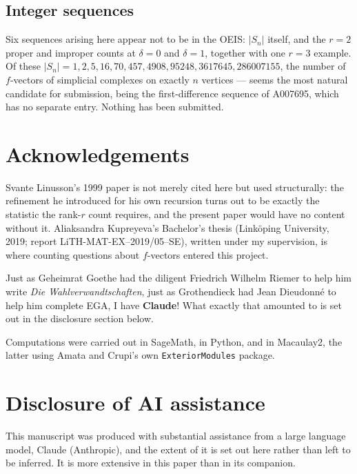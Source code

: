 \documentclass[11pt, a4paper, abstract=yes]{scrartcl}
\theoremstyle{definition}
\theoremstyle{remark}
\theoremstyle{plain}
\begin{document}
\subsection{Integer sequences}
\label{sec:org4ba6c2b}

Six sequences arising here appear not to be in the OEIS: \(|S_n|\) itself, and the \(r=2\)
proper and improper counts at \(\delta=0\) and \(\delta=1\), together with one \(r=3\) example. Of
these \(|S_n|=1,2,5,16,70,457,4908,95248,3617645,286007155\), the number of \(f\)-vectors of
simplicial complexes on exactly \(n\) vertices --- seems the most natural candidate for submission,
being the first-difference sequence of A007695, which has no separate entry. Nothing has been
submitted.
\section*{Acknowledgements}
\label{sec:org7d5e35a}
Svante Linusson's 1999 paper is not merely cited here but used structurally: the refinement he
introduced for his own recursion turns out to be exactly the statistic the rank-\(r\) count requires,
and the present paper would have no content without it. Aliaksandra Kupreyeva's Bachelor's thesis \autocite{Kupreyeva2019}
(Linköping University, 2019; report LiTH-MAT-EX--2019/05--SE), written under my supervision, is where
counting questions about \(f\)-vectors entered this project.

Just as Geheimrat Goethe had the diligent Friedrich Wilhelm Riemer to help him write \emph{Die
Wahlverwandtschaften}, just as Grothendieck had Jean Dieudonné to help him complete EGA, I have
\textbf{Claude}! What exactly that amounted to is set out in the disclosure section below.

Computations were carried out in SageMath, in Python, and in Macaulay2, the latter using Amata and
Crupi's own \texttt{ExteriorModules} package.
\section*{Disclosure of AI assistance}
\label{sec:orgc0065da}
This manuscript was produced with substantial assistance from a large language model, Claude
(Anthropic), and the extent of it is set out here rather than left to be inferred. It is more
extensive in this paper than in its companion.
\end{document}
